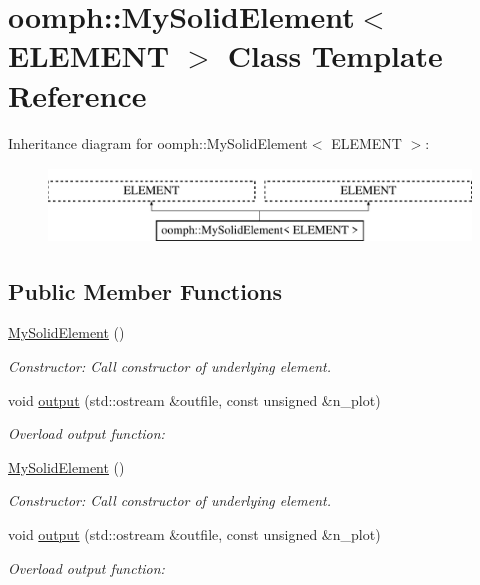 \hypertarget{classoomph_1_1MySolidElement}{}\section{oomph\+:\+:My\+Solid\+Element$<$ E\+L\+E\+M\+E\+NT $>$ Class Template Reference}
\label{classoomph_1_1MySolidElement}
Inheritance diagram for oomph\+:\+:My\+Solid\+Element$<$ E\+L\+E\+M\+E\+NT $>$\+:\begin{figure}[H]
\begin{center}
\leavevmode
\includegraphics[height=2.000000cm]{classoomph_1_1MySolidElement}
\end{center}
\end{figure}
\subsection*{Public Member Functions}
\begin{DoxyCompactItemize}
\item 
\hyperlink{classoomph_1_1MySolidElement_afe8a392ac0bed5890f64b75adea8f5af}{My\+Solid\+Element} ()
\begin{DoxyCompactList}\small\item\em Constructor\+: Call constructor of underlying element. \end{DoxyCompactList}\item 
void \hyperlink{classoomph_1_1MySolidElement_abf5b903419201b1fd6f1587749337650}{output} (std\+::ostream \&outfile, const unsigned \&n\+\_\+plot)
\begin{DoxyCompactList}\small\item\em Overload output function\+: \end{DoxyCompactList}\item 
\hyperlink{classoomph_1_1MySolidElement_afe8a392ac0bed5890f64b75adea8f5af}{My\+Solid\+Element} ()
\begin{DoxyCompactList}\small\item\em Constructor\+: Call constructor of underlying element. \end{DoxyCompactList}\item 
void \hyperlink{classoomph_1_1MySolidElement_abf5b903419201b1fd6f1587749337650}{output} (std\+::ostream \&outfile, const unsigned \&n\+\_\+plot)
\begin{DoxyCompactList}\small\item\em Overload output function\+: \end{DoxyCompactList}\end{DoxyCompactItemize}


